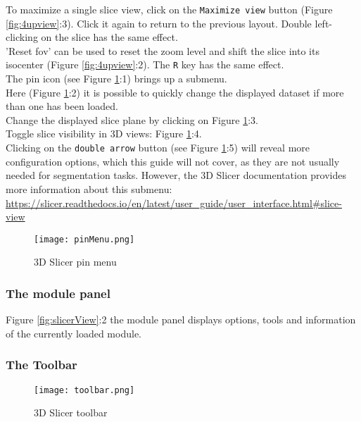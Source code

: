 \noindent
To maximize a single slice view, click on the \texttt{Maximize view} button (Figure \ref{fig:4upview}:3). Click it again to return to the previous layout. Double left-clicking on the slice has the same effect.\\

\noindent
'Reset \gls{fov}' can be used to reset the zoom level and shift the slice into its isocenter (Figure \ref{fig:4upview}:2). The \texttt{R} key has the same effect.\\

\noindent
The pin icon (see Figure \ref{fig:pinMenu}:1) brings up a submenu.\\
\noindent
Here (Figure \ref{fig:pinMenu}:2) it is possible to quickly change the displayed dataset if more than one has been loaded.\\
Change the displayed slice plane by clicking on Figure \ref{fig:pinMenu}:3.\\
Toggle slice visibility in 3D views: Figure \ref{fig:pinMenu}:4.\\
Clicking on the \texttt{double arrow} button (see Figure \ref{fig:pinMenu}:5) will reveal more configuration options, which this guide will not cover, as they are not usually needed for segmentation tasks.
However, the 3D Slicer documentation provides more information about this submenu: \url{https://slicer.readthedocs.io/en/latest/user_guide/user_interface.html#slice-view}
\begin{figure}[h!] %
	\centerline{ %
		\texttt{[image: pinMenu.png]}}
	\caption{3D Slicer pin menu}\label{fig:pinMenu}
\end{figure}
\pagebreak

\subsubsection{The module panel}
Figure \ref{fig:slicerView}:2 the module panel displays options, tools and information of the currently loaded module.

\subsubsection{The Toolbar}
\begin{figure}[h!] %
	\centerline{ %
		\texttt{[image: toolbar.png]}}
	\caption{3D Slicer toolbar}\label{fig:toolbar}
\end{figure}

